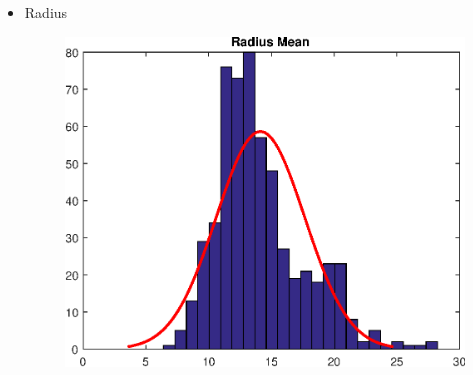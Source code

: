 \documentclass[11pt,a4paper]{article}
\numberwithin{equation}{section}
\begin{document}
\begin{itemize}
\item Radius
\begin{figure}[H]
\centering
  \includegraphics[width=.5\linewidth]{./img/radius_mean}
  \label{fig:test1}
\end{figure}%


\end{itemize}
\end{document}
